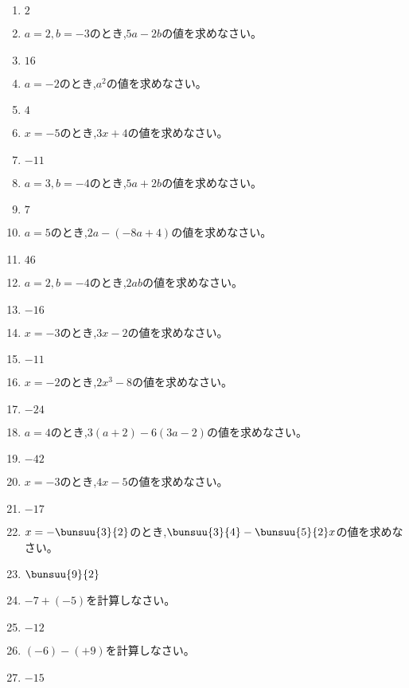 \documentclass[uplatex,a4j,11pt]{jsreport}
\begin{document}
\begin{multicols}{2}
\begin{enumerate}
    \item $2$
    \item $a=2,b=-3$のとき,\quad$5a-2b$\quad の値を求めなさい。%
    \item $16$
    \item $a=-2$のとき,\quad$a^2$\quad の値を求めなさい。%
    \item $4$
    \item $x=-5$のとき,\quad$3x+4$\quad の値を求めなさい。%
    \item $-11$
    \item $a=3, b=-4$のとき,\quad$5a+2b$\quad の値を求めなさい。%
    \item $7$
    \item $a=5$のとき,\quad$2a-(-8a+4)$\quad の値を求めなさい。%
    \item $46$
    \item $a=2, b=-4$のとき,\quad$2ab$\quad の値を求めなさい。%
    \item $-16$
    \item $x=-3$のとき,\quad$3x-2$\quad の値を求めなさい。%
    \item $-11$
    \item $x=-2$のとき,\quad$2x^3-8$\quad の値を求めなさい。%
    \item $-24$
    \item $a=4$のとき,\quad$3(a+2)-6(3a-2)$\quad の値を求めなさい。%
    \item $-42$
    \item $x=-3$のとき,\quad$4x-5$\quad の値を求めなさい。%
    \item $-17$
    \item $x=-\bunsuu{3}{2}$のとき,\quad$\bunsuu{3}{4}-\bunsuu{5}{2}x$\quad の値を求めなさい。%
    \item $\bunsuu{9}{2}$
    \item $-7+(-5)$\quad を計算しなさい。%
    \item $-12$
    \item $(-6)-(+9)$\quad を計算しなさい。%
    \item $-15$

\end{enumerate}
\end{multicols}
\end{document}
